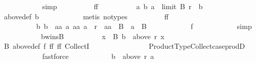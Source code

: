 \begin{isabellebody}
\ \ \ \ \ \ \ \ \ \ \isamarkupfalse%
\ simp\isanewline
\ \ \ \ \ \ \ \ \isamarkupfalse%
\ ff{}{\isacharcolon}{\kern0pt}\isanewline
\ \ \ \ \ \ \ \ \ \ {\isachardoublequoteopen}{\isacharbraceleft}{\kern0pt}a{\isachardot}{\kern0pt}\ {\isacharparenleft}{\kern0pt}b{\isacharcomma}{\kern0pt}\ a{\isacharparenright}{\kern0pt}\ {\isasymin}\ limit\ B\ r{\isacharbraceright}{\kern0pt}\ {\isacharequal}{\kern0pt}\ {\isacharbraceleft}{\kern0pt}b{\isacharbraceright}{\kern0pt}{\isachardoublequoteclose}\isanewline
\ \ \ \ \ \ \ \ \ \ \isamarkupfalse%
\ above{\isacharunderscore}{\kern0pt}def\ b\isanewline
\ \ \ \ \ \ \ \ \ \ \isamarkupfalse%
\ {\isacharparenleft}{\kern0pt}metis\ {\isacharparenleft}{\kern0pt}no{\isacharunderscore}{\kern0pt}types{\isacharparenright}{\kern0pt}{\isacharparenright}{\kern0pt}\isanewline
\ \ \ \ \ \ \ \ \isamarkupfalse%
\ ff{}{\isacharcolon}{\kern0pt}\isanewline
\ \ \ \ \ \ \ \ \ \ {\isachardoublequoteopen}{\isacharparenleft}{\kern0pt}b{\isacharcomma}{\kern0pt}\ b{\isacharparenright}{\kern0pt}\ {\isasymin}\ {\isacharbraceleft}{\kern0pt}{\isacharparenleft}{\kern0pt}aa{\isacharcomma}{\kern0pt}\ a{\isacharparenright}{\kern0pt}{\isachardot}{\kern0pt}\ {\isacharparenleft}{\kern0pt}aa{\isacharcomma}{\kern0pt}\ a{\isacharparenright}{\kern0pt}\ {\isasymin}\ r\ {\isasymand}\ aa\ {\isasymin}\ B\ {\isasymand}\ a\ {\isasymin}\ B{\isacharbraceright}{\kern0pt}{\isachardoublequoteclose}\isanewline
\ \ \ \ \ \ \ \ \ \ \isamarkupfalse%
\ f{}\isanewline
\ \ \ \ \ \ \ \ \ \ \isamarkupfalse%
\ simp\isanewline
\ \ \ \ \ \ \ \ \isamarkupfalse%
\ \isamarkupfalse%
\ b{\isacharunderscore}{\kern0pt}wins{\isacharunderscore}{\kern0pt}B{\isacharcolon}{\kern0pt}\isanewline
\ \ \ \ \ \ \ \ \ \ {\isachardoublequoteopen}{\isasymforall}x\ {\isasymin}\ B{\isachardot}{\kern0pt}\ b\ {\isasymin}\ above\ r\ x{\isachardoublequoteclose}\isanewline
\ \ \ \ \ \ \ \ \ \ \isamarkupfalse%
\ B\ above{\isacharunderscore}{\kern0pt}def\ f{}\ ff{}\ ff{}\ CollectI\isanewline
\ \ \ \ \ \ \ \ \ \ \ \ \ \ \ \ Product{\isacharunderscore}{\kern0pt}Type{\isachardot}{\kern0pt}Collect{\isacharunderscore}{\kern0pt}case{\isacharunderscore}{\kern0pt}prodD\isanewline
\ \ \ \ \ \ \ \ \ \ \isamarkupfalse%
\ fastforce\isanewline
\ \ \ \ \ \ \ \ \isamarkupfalse%
\ \isamarkupfalse%
\ {\isachardoublequoteopen}b\ {\isasymin}\ above\ r\ a{\isachardoublequoteclose}\isanewline

\end{isabellebody}
